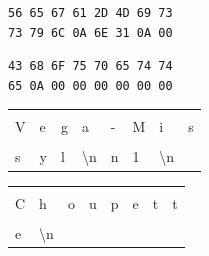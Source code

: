 \documentclass[11pt,a4paper]{article}
\begin{document}
\begin{table}[ht!]
  \centering
  \begin{minipage}{0.4\textwidth}
    \centering
\begin{lstlisting}[style=algorithmique]
56 65 67 61 2D 4D 69 73
73 79 6C 0A 6E 31 0A 00
\end{lstlisting}

\begin{lstlisting}[style=algorithmique]
43 68 6F 75 70 65 74 74
65 0A 00 00 00 00 00 00
\end{lstlisting}

  \end{minipage}
  \hfillx
  \begin{minipage}{0.45\textwidth}
    \centering

\begin{tabular}{ | m{0.45cm} | m{0.45cm} | m{0.45cm} | m{0.45cm}   |   m{0.45cm} | m{0.45cm} | m{0.45cm} | m{0.45cm} | }
\hline
   &   &   &   &   &   &   &   \\
 V & e & g & a & - & M & i & s \\
\hline
   &   &   &                    & \cellcolor{black!15}   & \cellcolor{black!15}   & \cellcolor{black!15}                   & \cellcolor{black!15} \\
 s & y & l & \textbackslash{}n  & \cellcolor{black!15} n & \cellcolor{black!15} 1 & \cellcolor{black!15} \textbackslash{}n & \cellcolor{black!15} \\
\hline
\end{tabular}

\bigskip

\bigskip

\begin{tabular}{ | m{0.45cm} | m{0.45cm} | m{0.45cm} | m{0.45cm}   |   m{0.45cm} | m{0.45cm} | m{0.45cm} | m{0.45cm} | }
\hline
   &   &   &   &   &   &   &   \\
 C & h & o & u & p & e & t & t \\
\hline
   &                   & \cellcolor{black!15} & \cellcolor{black!15} & \cellcolor{black!15} & \cellcolor{black!15} & \cellcolor{black!15} & \cellcolor{black!15} \\
 e & \textbackslash{}n & \cellcolor{black!15} & \cellcolor{black!15} & \cellcolor{black!15} & \cellcolor{black!15} & \cellcolor{black!15} & \cellcolor{black!15} \\
\hline
\end{tabular}

  \end{minipage}
\end{table}
\end{document}
